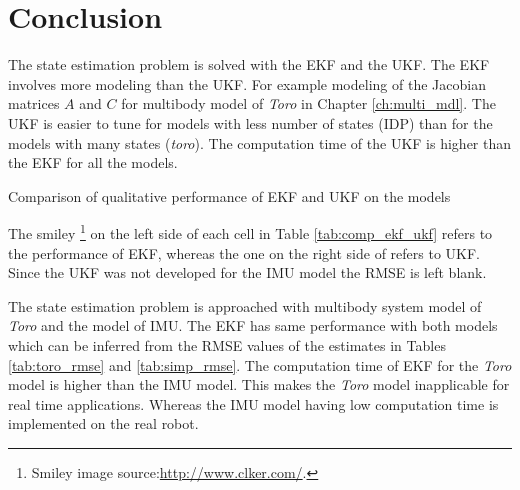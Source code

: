 \chapter{Conclusion}
\label{ch:conclusion}

 The state estimation problem is solved with the EKF and the UKF. The EKF involves more modeling than the UKF. For example modeling of the Jacobian matrices $A$ and $C$ for multibody model of \emph{Toro} in Chapter \ref{ch:multi_mdl}. The UKF is easier to tune for models with less number of states (IDP) than for the models with many states (\emph{toro}). The computation time of the UKF is higher than the EKF for all the models. 
 \begin{table}[H]
	\centering
	
	\caption{Comparison of qualitative performance of EKF and UKF on the models}
	\label{tab:comp_ekf_ukf}
\end{table}

The smiley \footnote{Smiley image source:\url{http://www.clker.com/}.} on the left side of each cell in Table \ref{tab:comp_ekf_ukf} refers to the performance of EKF, whereas the one on the right side of refers to UKF. Since the UKF was not developed for the IMU model the RMSE is left blank. 

The state estimation problem is approached with multibody system model of \emph{Toro} and the model of IMU. The EKF has same performance with both models which can be inferred from the RMSE values of the estimates in Tables \ref{tab:toro_rmse} and \ref{tab:simp_rmse}. The computation time of EKF for the \emph{Toro} model is higher than the IMU model. This makes the \emph{Toro} model inapplicable for real time applications. Whereas the IMU model having low computation time is implemented on the real robot.

